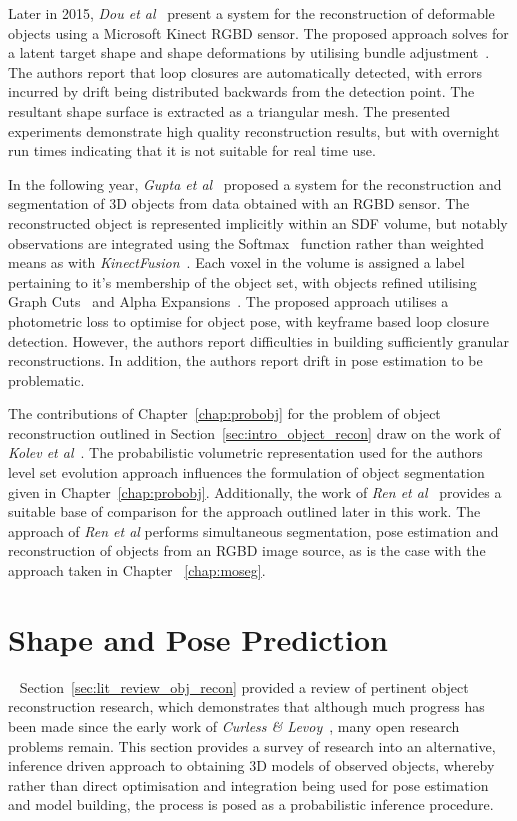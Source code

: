 Later in 2015, \textit{Dou et al}~\cite{Dou2015} present a system for the reconstruction of deformable 
objects using a Microsoft Kinect RGBD sensor. The proposed approach solves for a latent target shape 
and shape deformations by utilising bundle adjustment~\cite{Triggs1999}. The authors report that loop 
closures are automatically detected, with errors incurred by drift being distributed backwards from the 
detection point. The resultant shape surface is extracted as a triangular mesh. The presented experiments 
demonstrate high quality reconstruction results, but with overnight run times indicating that it is not 
suitable for real time use.

In the following year, \textit{Gupta et al}~\cite{Gupta2016} proposed a system for the reconstruction and 
segmentation of 3D objects from data obtained with an RGBD sensor. The reconstructed object is represented 
implicitly within an SDF volume, but notably observations are integrated using the Softmax~\cite{Murphy2012ML} 
function rather than weighted means as with \textit{KinectFusion}~\cite{Newcombe2011}. Each voxel in the 
volume is assigned a label pertaining to it's membership of the object set, with objects refined utilising 
Graph Cuts~\cite{CLRS} and Alpha Expansions~\cite{CLRS}. The proposed approach utilises a photometric loss to optimise 
for object pose, with keyframe based loop closure detection. However, the authors report difficulties in 
building sufficiently granular reconstructions. In addition, the authors report drift in pose estimation 
to be problematic.

The contributions of Chapter~\ref{chap:probobj} for the problem of object reconstruction outlined in 
Section~\ref{sec:intro_object_recon} draw on the work of \textit{Kolev et al}~\cite{Kolev2006}. The 
probabilistic volumetric representation used for the authors level set evolution approach influences the 
formulation of object segmentation given in Chapter~\ref{chap:probobj}. Additionally, the work of 
\textit{Ren et al}~\cite{Ren2013} provides a suitable base of comparison for the approach outlined later 
in this work. The approach of \textit{Ren et al} performs simultaneous segmentation, pose estimation and 
reconstruction of objects from an RGBD image source, as is the case with the approach taken in Chapter
~\ref{chap:moseg}.

\section{Shape and Pose Prediction}
~\label{sec:lit_review_prediction}
Section~\ref{sec:lit_review_obj_recon} provided a review of pertinent object reconstruction research, 
which demonstrates that although much progress has been made since the early work of \textit{Curless \& 
Levoy}~\cite{Curless1996}, many open research problems remain. This section provides a survey of research 
into an alternative, inference driven approach to obtaining 3D models of observed 
objects, whereby rather than direct optimisation and integration being used for pose estimation and 
model building, the process is posed as a probabilistic inference procedure.

